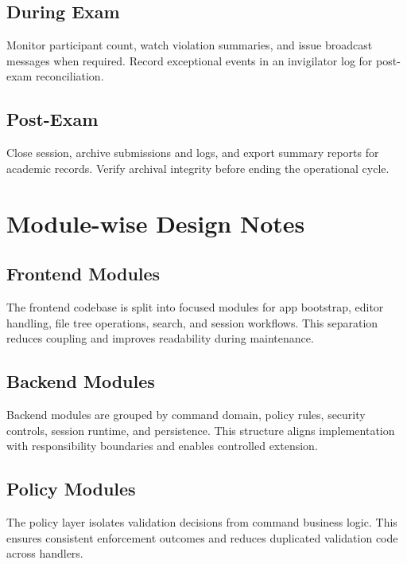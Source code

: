 \documentclass[12pt,a4paper]{report}
\begin{document}
	\subsection{During Exam}
	Monitor participant count, watch violation summaries, and issue broadcast messages when required. Record exceptional events in an invigilator log for post-exam reconciliation.
	
	\subsection{Post-Exam}
	Close session, archive submissions and logs, and export summary reports for academic records. Verify archival integrity before ending the operational cycle.
	
	\section{Module-wise Design Notes}
	\subsection{Frontend Modules}
	The frontend codebase is split into focused modules for app bootstrap, editor handling, file tree operations, search, and session workflows. This separation reduces coupling and improves readability during maintenance.
	
	\subsection{Backend Modules}
	Backend modules are grouped by command domain, policy rules, security controls, session runtime, and persistence. This structure aligns implementation with responsibility boundaries and enables controlled extension.
	
	\subsection{Policy Modules}
	The policy layer isolates validation decisions from command business logic. This ensures consistent enforcement outcomes and reduces duplicated validation code across handlers.
	
\end{document}
